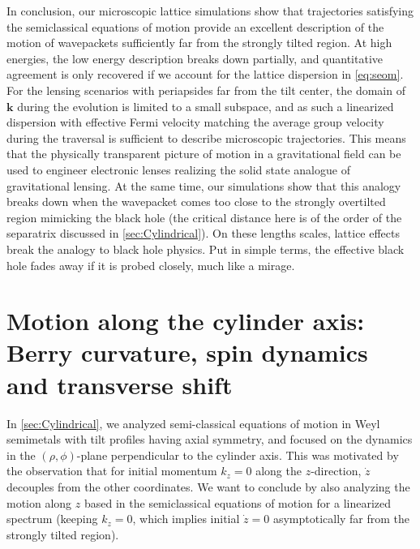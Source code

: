 \documentclass[submission, Phys]{SciPost}
\begin{document}
In conclusion, our microscopic lattice simulations show that trajectories satisfying the semiclassical equations of motion provide an excellent description of the motion of wavepackets sufficiently far from the strongly tilted region.
At high energies, the low energy description breaks down partially, and quantitative agreement is only recovered if we account for the lattice dispersion in \cref{eq:seom}.
For the lensing scenarios with periapsides far from the tilt center, the domain of $\bm k$ during the evolution is limited to a small subspace, and as such a linearized dispersion with effective Fermi velocity matching the average group velocity during the traversal is sufficient to describe microscopic trajectories.
This means that the physically transparent picture of motion in a gravitational field can be used to engineer electronic lenses realizing the solid state analogue of gravitational lensing.
At the same time, our simulations show that this analogy breaks down when the wavepacket comes too close to the strongly overtilted region mimicking the black hole (the critical distance here is of the order of the separatrix discussed in \cref{sec:Cylindrical}).
On these lengths scales, lattice effects break the analogy to black hole physics. Put in simple terms, the effective black hole fades away if it is probed closely, much like a mirage.

\section{Motion along the cylinder axis: Berry curvature, spin dynamics and transverse shift}
\label{sec:Berry}
 In \cref{sec:Cylindrical}, we analyzed semi-classical equations of motion in Weyl semimetals with tilt profiles having axial symmetry, and focused on the dynamics in the $(\rho,\phi)$-plane perpendicular to the cylinder axis. This was motivated by the observation that for initial momentum $k_z=0$ along the $z$-direction, $\dot{z}$ decouples from the other coordinates. We want to conclude by also analyzing the motion along $z$ based in the semiclassical equations of motion for a linearized spectrum (keeping $k_z=0$, which implies initial $\dot{z}=0$ asymptotically far from the strongly tilted region).
\end{document}
